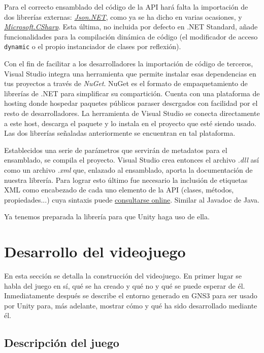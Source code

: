 Para el correcto ensamblado del código de la API hará falta la importación de dos librerías externas: \href{https://www.nuget.org/packages/Newtonsoft.Json/}{\textit{Json.NET}}, como ya se ha dicho en varias ocasiones, y \href{https://www.nuget.org/packages/Microsoft.CSharp/}{\textit{Microsoft.CSharp}}. Esta última, no incluida por defecto en .NET Standard, añade funcionalidades para la compilación dinámica de código (el modificador de acceso \texttt{dynamic} o el propio instanciador de clases por reflexión).

Con el fin de facilitar a los desarrolladores la importación de código de terceros, Visual Studio integra una herramienta que permite instalar esas dependencias en tus proyectos a través de \textit{NuGet}. NuGet es el formato de empaquetamiento de librerías de .NET para simplificar su compartición. Cuenta con una plataforma de hosting donde hospedar paquetes públicos paraser descrgados con facilidad por el resto de desarrolladores. La herramienta de Visual Studio se conecta directamente a este host, descarga el paquete y lo instala en el proyecto que esté siendo usado. Las dos librerías señaladas anteriormente se encuentran en tal plataforma.

Establecidos una serie de parámetros que servirán de metadatos para el ensamblado, se compila el proyecto. Visual Studio crea entonces el archivo \textit{.dll} así como un archivo \textit{.xml} que, enlazado al ensamblado, aporta la documentación de nuestra librería. Para lograr esto último fue necesario la inclusión de etiquetas XML como encabezado de cada uno elemento de la API (clases, métodos, propiedades...) cuya sintaxis puede \href{https://docs.microsoft.com/en-us/dotnet/csharp/programming-guide/xmldoc/xml-documentation-comments}{consultarse online}. Similar al Javadoc de Java.

Ya tenemos preparada la librería para que Unity haga uso de ella.

\section{Desarrollo del videojuego}
En esta sección se detalla la construcción del videojuego. En primer lugar se habla del juego en sí, qué se ha creado y qué no y qué se puede esperar de él. Inmediatamente después se describe el entorno generado en GNS3 para ser usado por Unity para, más adelante, mostrar cómo y qué ha sido desarrollado mediante él.

\subsection{Descripción del juego}

